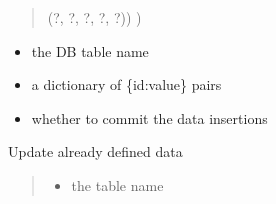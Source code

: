 \documentclass[letterpaper,10pt,english]{sphinxmanual}
\begin{document}
\begin{fulllineitems}
\begin{fulllineitems}
\begin{itemize}
\end{itemize}

\end{fulllineitems}


\begin{fulllineitems}
\label{\detokenize{modules_doc:cbmpy.CBNetDB.DBTools.insertData}}
\pysigstartsignatures
{}
\pysigstopsignatures\begin{description}
\begin{quote}

\sphinxAtStartPar
(?, ?, ?, ?, ?)) )
\end{quote}
\begin{itemize}
\item {} 
\sphinxAtStartPar
{} the DB table name

\item {} 
\sphinxAtStartPar
{} a dictionary of \{id:value\} pairs

\item {} 
\sphinxAtStartPar
{} whether to commit the data insertions

\end{itemize}

\end{description}

\end{fulllineitems}


\begin{fulllineitems}
\label{\detokenize{modules_doc:cbmpy.CBNetDB.DBTools.updateData}}
\pysigstartsignatures
{}
\pysigstopsignatures
\sphinxAtStartPar
Update already defined data
\begin{quote}
\begin{itemize}
\item {} 
\sphinxAtStartPar
{} the table name


\end{itemize}
\end{quote}
\end{fulllineitems}
\end{fulllineitems}
\end{document}
